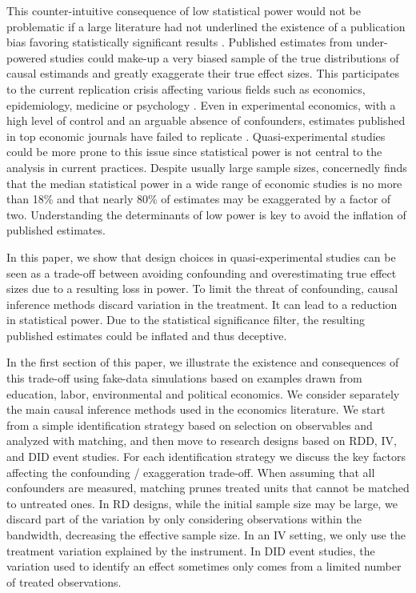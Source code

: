 \documentclass[12pt]{article}
\begin{document}
This counter-intuitive consequence of low statistical power would not be problematic if a large literature had not underlined the existence of a publication bias favoring statistically significant results \citep[for instance]{rosenthal_file_1979, andrews_identification_2019, abadie_statistical_2020, brodeur_methods_2020}. Published estimates from under-powered studies could make-up a very biased sample of the true distributions of causal estimands and greatly exaggerate their true effect sizes. This participates to the current replication crisis affecting various fields such as economics, epidemiology, medicine or psychology \citep{button_power_2013, open_science_collaboration_estimating_2015, camerer_evaluating_2016, chang_is_2022}. Even in experimental economics, with a high level of control and an arguable absence of confounders, estimates published in top economic journals have failed to replicate \cite{camerer_evaluating_2016}. Quasi-experimental studies could be more prone to this issue since statistical power is not central to the analysis in current practices. Despite usually large sample sizes, \cite{ioannidis_power_2017} concernedly finds that the median statistical power in a wide range of economic studies is no more than 18\% and that nearly 80\% of estimates may be exaggerated by a factor of two. Understanding the determinants of low power is key to avoid the inflation of published estimates. 

In this paper, we show that design choices in quasi-experimental studies can be seen as a trade-off between avoiding confounding and overestimating true effect sizes due to a resulting loss in power. To limit the threat of confounding, causal inference methods discard variation in the treatment. It can lead to a reduction in statistical power. Due to the statistical significance filter, the resulting published estimates could be inflated and thus deceptive. 

In the first section of this paper, we illustrate the existence and consequences of this trade-off using fake-data simulations based on examples drawn from education, labor, environmental and political economics. We consider separately the main causal inference methods used in the economics literature. We start from a simple identification strategy based on selection on observables and analyzed with matching, and then move to research designs based on RDD, IV, and DID event studies. For each identification strategy we discuss the key factors affecting the confounding / exaggeration trade-off. When assuming that all confounders are measured, matching prunes treated units that cannot be matched to untreated ones. In RD designs, while the initial sample size may be large, we discard part of the variation by only considering observations within the bandwidth, decreasing the effective sample size. In an IV setting, we only use the treatment variation explained by the instrument. In DID event studies, the variation used to identify an effect sometimes only comes from a limited number of treated observations. 
\end{document}
